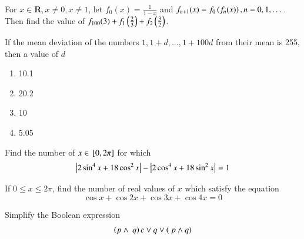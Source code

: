 \documentclass[journal,12pt,twocolumn]{IEEEtran}
\begin{document}
\begin{problem}
For $x \in \mathbf{R}, x \neq 0, x \neq 1$, let $f_0(x) = \frac{1}{1-x}$ 
and $f_{n+1}(x) = f_0\left(f_n(x)\right), n = 0, 1, \dots $.  Then find the value of
$f_{100}(3) + f_1\left(\frac{2}{3}\right)+f_2\left(\frac{3}{2}\right)$.
\end{problem}
%
\solution



%
\begin{problem}
If the mean deviation of the numbers $1,1+d,\dots, 1+100d$ from their mean
is 255, then a value of $d$
\begin{enumerate}
\item 10.1
\item 20.2
\item 10
\item 5.05
\end{enumerate}
\end{problem}
\begin{problem}
Find the number of $x \in {}\left[0,2\pi\right]$  for which
\begin{equation}
\left\vert2\sin^4 x + 18 \cos ^2 x \right\vert-\left\vert2\cos^4 x + 18 \sin ^2 x \right\vert = 1
\end{equation}
\end{problem}
\begin{problem}
If $0 \le x \le 2\pi$, find the number of real values of $x$ which satisfy the equation
\begin{equation}
\cos x + \cos 2x + \cos 3x + \cos 4x = 0
\end{equation}
\end{problem}
\begin{problem}
Simplify the Boolean expression
\begin{equation}
\left(p\wedge ~q\right)c\vee q \vee \left(~p\wedge q\right)
\end{equation}
\end{problem}
\end{document}
